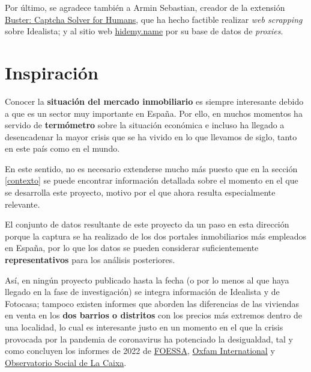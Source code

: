 \documentclass[12pt]{article}
\begin{document}
Por último, se agradece también a Armin Sebastian, creador de la extensión \href{https://chrome.google.com/webstore/detail/buster-captcha-solver-for/mpbjkejclgfgadiemmefgebjfooflfhl}{Buster: Captcha Solver for Humans}, que ha hecho factible realizar \textit{web scrapping} sobre Idealista; y al sitio web \href{https://hidemy.name/proxy-list/}{hidemy.name} por su base de datos de \textit{proxies}.

\vspace{-1.5em}\section{Inspiración}\vspace{-1em}

Conocer la \textbf{situación del mercado inmobiliario} es siempre interesante debido a que es un sector muy importante en España. Por ello, en muchos momentos ha servido de \textbf{termómetro} sobre la situación económica e incluso ha llegado a desencadenar la mayor crisis que se ha vivido en lo que llevamos de siglo, tanto en este país como en el mundo. 

En este sentido, no es necesario extenderse mucho más puesto que en la sección \ref{contexto} se puede encontrar información detallada sobre el momento en el que se desarrolla este proyecto, motivo por el que ahora resulta especialmente relevante.

El conjunto de datos resultante de este proyecto da un paso en esta dirección porque la captura se ha realizado de los dos portales inmobiliarios más empleados en España, por lo que los datos se pueden considerar suficientemente \textbf{representativos} para los análisis posteriores. 

Así, en ningún proyecto publicado hasta la fecha (o por lo menos al que haya llegado en la fase de investigación) se integra información de Idealista y de Fotocasa; tampoco existen informes que aborden las diferencias de las viviendas en venta en los \textbf{dos barrios o distritos} con los precios más extremos dentro de una localidad, lo cual es interesante justo en un momento en el que la crisis provocada por la pandemia de coronavirus ha potenciado la desigualdad, tal y como concluyen los informes de 2022 de \href{https://www.foessa.es/blog/foessa-presenta-la-primera-radiografia-social-completa-de-la-crisis-de-la-covid-19-en-toda-espana/}{FOESSA}, \href{https://oxfamilibrary.openrepository.com/bitstream/handle/10546/621341/bp-inequality-kills-170122-es.pdf}{Oxfam International} y \href{https://elobservatoriosocial.fundacionlacaixa.org/documents/22890/492074/T01_ID_ES_AyalaCant%C3%B3.pdf/a0746431-109f-e009-6c77-296c378f0438?t=1642072938395}{Observatorio Social de La Caixa}.
\end{document}
